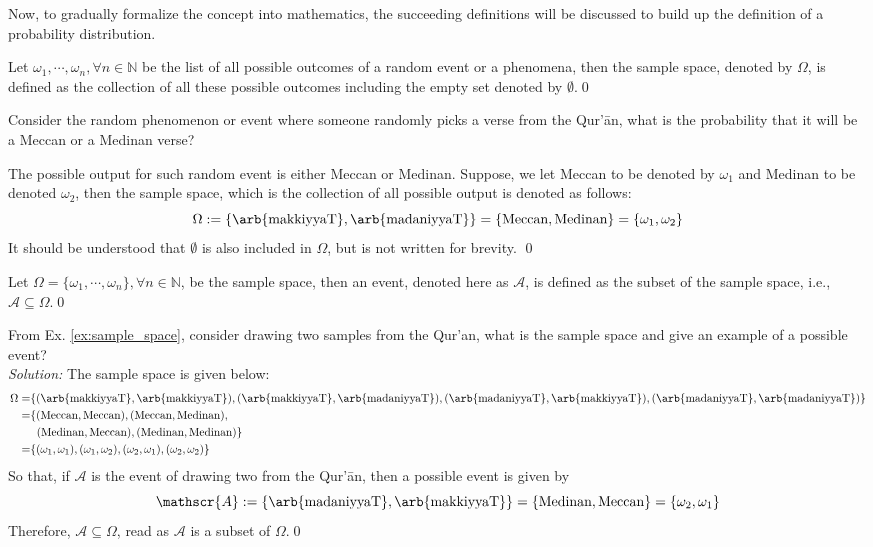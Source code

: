 Now, to gradually formalize the concept into mathematics, the succeeding definitions will be discussed to build up the definition of a probability distribution.
\begin{defnx}
Let $\omega_1,\cdots,\omega_n, \forall n\in\mathbb{N}$ be the list of all possible outcomes of a random event or a phenomena, then the sample space, denoted by $\Omega$, is defined as the collection of all these possible outcomes including the empty set denoted by $\emptyset$.\qed
\end{defnx}
\begin{exmpx}\label{ex:sample_space}
Consider the random phenomenon or event where someone randomly picks a verse from the Qur'\=an, what is the probability that it will be a Meccan  or a Medinan  verse?

The possible output for such random event is either Meccan or Medinan. Suppose, we let Meccan to be denoted by $\omega_1$ and Medinan to be denoted $\omega_2$, then the sample space, which is the collection of all possible output is denoted as follows:
\begin{equation}\label{ex_eq:sample_space}
    \Omega:=\{\text{\arb{makkiyyaT}},\text{\arb{madaniyyaT}}\}=\{\text{Meccan}, \text{Medinan}\}=\{\omega_1,\omega_2\}
\end{equation}
It should be understood that $\emptyset$ is also included in $\Omega$, but is not written for brevity.
\qed
\end{exmpx}
\begin{defnx}[Event]
Let $\Omega=\{\omega_1,\cdots,\omega_n\}, \forall n\in\mathbb{N}$, be the sample space, then an event, denoted here as $\mathscr{A}$, is defined as the subset of the sample space, i.e., $\mathscr{A}\subseteq{\Omega}$.\qed
\end{defnx}
\begin{exmpx}
From Ex. \ref{ex:sample_space}, consider drawing two samples from the Qur'an, what is the sample space and give an example of a possible event?\\
\textit{Solution:} The sample space is given below:
\begin{align}
    \Omega=&\{(\text{\arb{makkiyyaT}},\text{\arb{makkiyyaT}}),(\text{\arb{makkiyyaT}},\text{\arb{madaniyyaT}}), (\text{\arb{madaniyyaT}}, \text{\arb{makkiyyaT}}), (\text{\arb{madaniyyaT}}, \text{\arb{madaniyyaT}})\}\nonumber\\
    =&\{(\text{Meccan},\text{Meccan}),(\text{Meccan},\text{Medinan}), \\
    &\;\;(\text{Medinan},\text{Meccan}), (\text{Medinan},\text{Medinan})\}\\
    =&\{(\omega_1,\omega_1),(\omega_1,\omega_2),(\omega_2,\omega_1),(\omega_2,\omega_2)\}
\end{align}
So that, if $\mathscr{A}$ is the event of drawing two   from the Qur'\=an, then a possible event is given by 
\begin{equation}
    \mathscr{A}:=\{\text{\arb{madaniyyaT}}, \text{\arb{makkiyyaT}}\}=\{\text{Medinan}, \text{Meccan}\}=\{\omega_2,\omega_1\}
\end{equation}
Therefore, $\mathscr{A}\subseteq\Omega$, read as $\mathscr{A}$ is a subset of $\Omega$.\qed
\end{exmpx}
